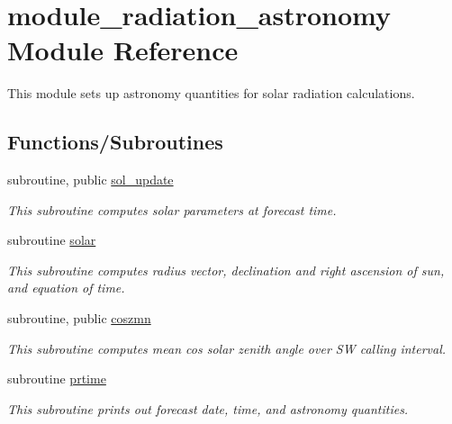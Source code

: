 \hypertarget{namespacemodule__radiation__astronomy}{}\section{module\+\_\+radiation\+\_\+astronomy Module Reference}
\label{namespacemodule__radiation__astronomy}


This module sets up astronomy quantities for solar radiation calculations.  


\subsection*{Functions/\+Subroutines}
\begin{DoxyCompactItemize}
\item 
subroutine, public \hyperlink{namespacemodule__radiation__astronomy_a7c3585f7355925b360f5bc5d2c25c09e}{sol\+\_\+update}                                                                                       
\begin{DoxyCompactList}\small\item\em This subroutine computes solar parameters at forecast time. \end{DoxyCompactList}\item 
subroutine \hyperlink{namespacemodule__radiation__astronomy_a3c99615d1cda89bcdb5ea1af3bca9d6f}{solar}                                                                                                 
\begin{DoxyCompactList}\small\item\em This subroutine computes radius vector, declination and right ascension of sun, and equation of time. \end{DoxyCompactList}\item 
subroutine, public \hyperlink{namespacemodule__radiation__astronomy_a8ce5ecf0524d0460baf6c467b532085c}{coszmn}                                                                                               
\begin{DoxyCompactList}\small\item\em This subroutine computes mean cos solar zenith angle over SW calling interval. \end{DoxyCompactList}\item 
subroutine \hyperlink{namespacemodule__radiation__astronomy_a946b520f4b41e21f9f9e27da6122641b}{prtime}                                                                                               
\begin{DoxyCompactList}\small\item\em This subroutine prints out forecast date, time, and astronomy quantities. \end{DoxyCompactList}\end{DoxyCompactItemize}
